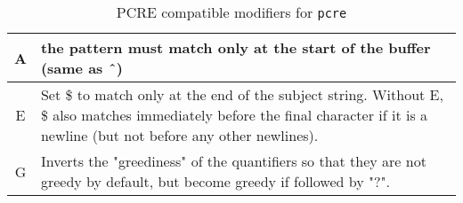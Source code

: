 \documentclass[english]{report}
\begin{document}
\begin{table}[ht]
\begin{center}
\caption{PCRE compatible modifiers for \texttt{pcre}}
\label{pcre-mod_pcre}
\begin{tabular}{|c|p{4.5in}|}

\hline
A &

the pattern must match only at the start of the buffer (same as \^\ ) \\

\hline
E &

Set \$ to match only at the end of the subject string.  Without E, \$ also
matches immediately before the final character if it is a newline (but not
before any other newlines). \\

\hline
G &

Inverts the "greediness" of the quantifiers so that they are not greedy by
default, but become greedy if followed by "?". \\

\hline
\end{tabular}
\end{center}
\end{table}
\end{document}

